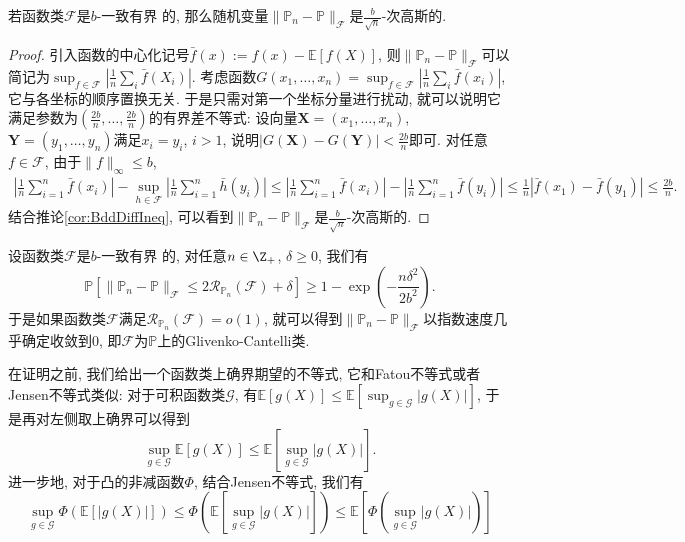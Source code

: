 \begin{lemma}
	若函数类$\mathscr{F}$是$b$-一致有界	的, 那么随机变量$\|\mathbb{P}_n - \mathbb{P}\|_{\mathscr{F}}$是$\frac{b}{\sqrt{n}}$-次高斯的. 
\end{lemma}
\begin{proof}
	引入函数的中心化记号$\bar f(x) := f(x) - \mathbb{E}[f(X)]$, 则$\|\mathbb{P}_n - \mathbb{P}\|_{\mathscr{F}}$可以简记为$\sup_{f \in \mathscr{F}} |\frac{1}{n} \sum_i \bar f(X_i)|$. 
	考虑函数$G(x_1, \dots, x_n) = \sup_{f \in \mathscr{F}} |\frac{1}{n} \sum_i \bar f(x_i)|$, 它与各坐标的顺序置换无关. 
	于是只需对第一个坐标分量进行扰动, 就可以说明它满足参数为$(\frac{2b}{n}, \dots, \frac{2b}{n})$的有界差不等式: 
	设向量$\bm{X} = (x_1, \dots, x_n)$, $\bm{Y} = (y_1, \dots, y_n)$满足$x_i = y_i$, $i > 1$, 说明$|G(\bm{X}) - G(\bm{Y})| < \frac{2b}{n}$即可. 
	对任意$f \in \mathscr{F}$, 由于$\|f\|_{\infty} \leq b$, 
	\begin{align*}
		\left|\frac{1}{n} \sum_{i=1}^n \bar f(x_i)\right| - \sup_{h \in \mathscr{F}} \left|\frac{1}{n} \sum_{i=1}^n \bar h(y_i)\right|
		\leq \left|\frac{1}{n} \sum_{i=1}^n \bar f(x_i)\right| - \left|\frac{1}{n} \sum_{i=1}^n \bar f(y_i)\right|
		\leq \frac{1}{n} |\bar f(x_1) - \bar f(y_1)| 
		\leq \frac{2b}{n}. 
	\end{align*}
	结合推论\ref{cor:BddDiffIneq}, 可以看到$\|\mathbb{P}_n - \mathbb{P}\|_{\mathscr{F}}$是$\frac{b}{\sqrt{n}}$-次高斯的. 
\end{proof}

\begin{theorem}\label{thm:EmpericalMeasureErrorUpperBddByRC}
	设函数类$\mathscr{F}$是$b$-一致有界	的, 对任意$n \in \Z_+$, $\delta \geq 0$, 我们有
	\begin{equation*}
		\mathbb{P} \left[ \|\mathbb{P}_n - \mathbb{P}\|_{\mathscr{F}} \leq 2 \mathcal{R}_{\mathbb{P}_n}(\mathscr{F}) + \delta \right]
		\geq 1 - \exp \left(- \frac{n \delta^2}{2 b^2} \right). 
	\end{equation*}
	于是如果函数类$\mathscr{F}$满足$\mathcal{R}_{\mathbb{P}_n}(\mathscr{F}) = o(1)$, 就可以得到$\|\mathbb{P}_n - \mathbb{P}\|_{\mathscr{F}}$以指数速度几乎确定收敛到$0$, 即$\mathscr{F}$为$\mathbb{P}$上的Glivenko-Cantelli类. 
\end{theorem}

在证明之前, 我们给出一个函数类上确界期望的不等式, 它和Fatou不等式或者Jensen不等式类似:
对于可积函数类$\mathscr{G}$, 有$\mathbb{E} [g(X)] \leq \mathbb{E}\left[ \sup_{g \in \mathscr{G}} |g(X)| \right]$, 于是再对左侧取上确界可以得到
\begin{equation}\label{eq:SupIneq}
	\sup_{g \in \mathscr{G}} \mathbb{E} [g(X)] 
	\leq  \mathbb{E}\left[ \sup_{g \in \mathscr{G}} |g(X)| \right]. 
\end{equation}
进一步地, 对于凸的非减函数$\Phi$, 结合Jensen不等式, 我们有
\begin{equation}\label{eq:SupJensenIneq}
	\sup_{g \in \mathscr{G}} \Phi(\mathbb{E} [|g(X)|])
	\leq \Phi \left( \mathbb{E} \left[ \sup_{g \in \mathscr{G}} |g(X)| \right] \right)
	\leq \mathbb{E} \left[ \Phi \left( \sup_{g \in \mathscr{G}} |g(X)| \right) \right]
\end{equation}

